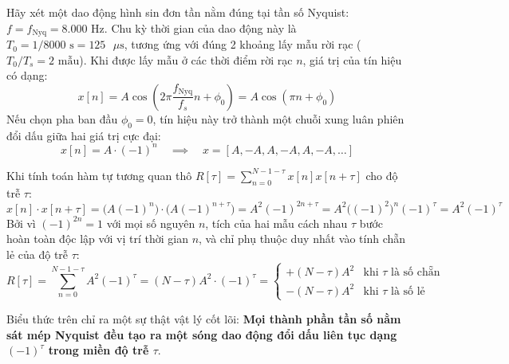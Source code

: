 Hãy xét một dao động hình sin đơn tần nằm đúng tại tần số Nyquist: $f = f_{\text{Nyq}} = 8.000\text{ Hz}$. Chu kỳ thời gian của dao động này là $T_0 = 1 / 8000\text{ s} = 125\text{ }\mu\text{s}$, tương ứng với đúng 2 khoảng lấy mẫu rời rạc ($T_0 / T_s = 2\text{ mẫu}$). Khi được lấy mẫu ở các thời điểm rời rạc $n$, giá trị của tín hiệu có dạng:
\begin{equation}
x[n] = A \cos\left(2\pi \frac{f_{\text{Nyq}}}{f_s} n + \phi_0\right) = A \cos(\pi n + \phi_0)
\end{equation}
Nếu chọn pha ban đầu $\phi_0 = 0$, tín hiệu này trở thành một chuỗi xung luân phiên đổi dấu giữa hai giá trị cực đại:
\begin{equation}
x[n] = A \cdot (-1)^n \quad \implies \quad x = [A, -A, A, -A, A, -A, \dots]
\end{equation}

Khi tính toán hàm tự tương quan thô $R[\tau] = \sum_{n=0}^{N-1-\tau} x[n] x[n+\tau]$ cho độ trễ $\tau$:
\begin{equation}
x[n] \cdot x[n+\tau] = \big(A (-1)^n\big) \cdot \big(A (-1)^{n+\tau}\big) = A^2 (-1)^{2n+\tau} = A^2 \big((-1)^2\big)^n (-1)^\tau = A^2 (-1)^\tau
\end{equation}
Bởi vì $(-1)^{2n} = 1$ với mọi số nguyên $n$, tích của hai mẫu cách nhau $\tau$ bước hoàn toàn độc lập với vị trí thời gian $n$, và chỉ phụ thuộc duy nhất vào tính chẵn lẻ của độ trễ $\tau$:
\begin{equation}
R[\tau] = \sum_{n=0}^{N-1-\tau} A^2 (-1)^\tau = (N - \tau) A^2 \cdot (-1)^\tau = 
\begin{cases} 
+(N - \tau) A^2 & \text{khi } \tau \text{ là số chẵn} \\
-(N - \tau) A^2 & \text{khi } \tau \text{ là số lẻ}
\end{cases}
\end{equation}

Biểu thức trên chỉ ra một sự thật vật lý cốt lõi: \textbf{Mọi thành phần tần số nằm sát mép Nyquist đều tạo ra một sóng dao động đổi dấu liên tục dạng $(-1)^\tau$ trong miền độ trễ $\tau$}.

